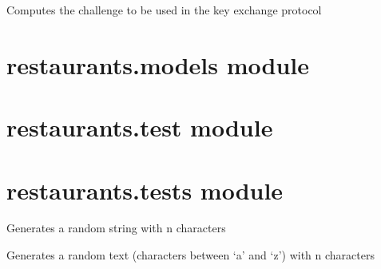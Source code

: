 \documentclass[letterpaper,10pt,english]{sphinxmanual}
\begin{document}

\begin{fulllineitems}
\label{restaurants:restaurants.key_exchange.createChallenge}
Computes the challenge to be used in the key exchange protocol

\end{fulllineitems}



\section{restaurants.models module}
\label{restaurants:restaurants-models-module}

\section{restaurants.test module}
\label{restaurants:module-restaurants.test}\label{restaurants:restaurants-test-module}

\begin{fulllineitems}
\label{restaurants:restaurants.test.test_sum}
\end{fulllineitems}



\section{restaurants.tests module}
\label{restaurants:restaurants-tests-module}\label{restaurants:module-restaurants.tests}

\begin{fulllineitems}
\label{restaurants:restaurants.tests.random_string}
Generates a random string with n characters

\end{fulllineitems}


\begin{fulllineitems}
\label{restaurants:restaurants.tests.random_text}
Generates a random text (characters between `a' and `z') with n characters

\end{fulllineitems}
\end{document}
